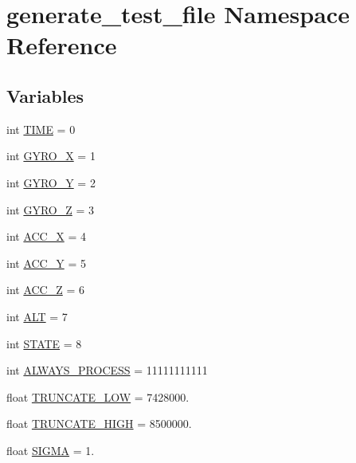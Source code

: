 \hypertarget{namespacegenerate__test__file}{\section{generate\-\_\-test\-\_\-file Namespace Reference}
\label{namespacegenerate__test__file}
}
\subsection*{Variables}
\begin{DoxyCompactItemize}
\item 
int \hyperlink{namespacegenerate__test__file_acac037ffc01eb13b0170baa6d36084d7}{T\-I\-M\-E} = 0
\item 
int \hyperlink{namespacegenerate__test__file_acc0d977a4653e6323d3544f555bd7864}{G\-Y\-R\-O\-\_\-\-X} = 1
\item 
int \hyperlink{namespacegenerate__test__file_a79b2d88416dae5a3c9ad3b99c54d2b06}{G\-Y\-R\-O\-\_\-\-Y} = 2
\item 
int \hyperlink{namespacegenerate__test__file_ad6bedebfe072e60e788572c7d64e1e64}{G\-Y\-R\-O\-\_\-\-Z} = 3
\item 
int \hyperlink{namespacegenerate__test__file_a791be27689f2e788f094b8e7979d0ce5}{A\-C\-C\-\_\-\-X} = 4
\item 
int \hyperlink{namespacegenerate__test__file_a05ef68f4898431020a52ab74ce601344}{A\-C\-C\-\_\-\-Y} = 5
\item 
int \hyperlink{namespacegenerate__test__file_acda104682ad45955b987af0fe6805b35}{A\-C\-C\-\_\-\-Z} = 6
\item 
int \hyperlink{namespacegenerate__test__file_a225fdf315bf7bde704cf249468eb5ecf}{A\-L\-T} = 7
\item 
int \hyperlink{namespacegenerate__test__file_a9ec6da862c40cd9158e10d93512b24b7}{S\-T\-A\-T\-E} = 8
\item 
int \hyperlink{namespacegenerate__test__file_a063f15b4ec460755dbe0da62cdd3f591}{A\-L\-W\-A\-Y\-S\-\_\-\-P\-R\-O\-C\-E\-S\-S} = 11111111111
\item 
float \hyperlink{namespacegenerate__test__file_ada1a42c5be5a227c2be722c4d7d23648}{T\-R\-U\-N\-C\-A\-T\-E\-\_\-\-L\-O\-W} = 7428000.
\item 
float \hyperlink{namespacegenerate__test__file_a8ff60229255336e07fa45731becdd888}{T\-R\-U\-N\-C\-A\-T\-E\-\_\-\-H\-I\-G\-H} = 8500000.
\item 
float \hyperlink{namespacegenerate__test__file_a34a98faa00c665c3cc688ef6d170b3c0}{S\-I\-G\-M\-A} = 1.

\end{DoxyCompactItemize}

